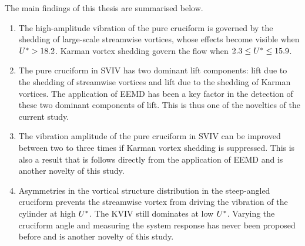 \documentclass[oneside]{utmthesis}
\begin{document}
\noindent The main findings of this thesis are summarised below.

\begin{enumerate}

  \item The high-amplitude vibration of the pure cruciform is governed by the shedding of large-scale streamwise vortices, whose effects become visible when $U^{*} > 18.2$. Karman vortex shedding govern the flow when $2.3 \leq U^{*} \leq 15.9$.

  \item The pure cruciform in SVIV has two dominant lift components: lift due to the shedding of streamwise vortices and lift due to the shedding of Karman vortices. The application of EEMD has been a key factor in the detection of these two dominant components of lift. This is thus one of the novelties of the current study.

  \item The vibration amplitude of the pure cruciform in SVIV can be improved between two to three times if Karman vortex shedding is suppressed. This is also a result that is follows directly from the application of EEMD and is another novelty of this study.


  \item Asymmetries in the vortical structure distribution in the steep-angled cruciform prevents the streamwise vortex from driving the vibration of the cylinder at high $U^{*}$. The KVIV still dominates at low $U^{*}$. Varying the cruciform angle and measuring the system response has never been proposed before and is another novelty of this study.


\end{enumerate}
\end{document}
